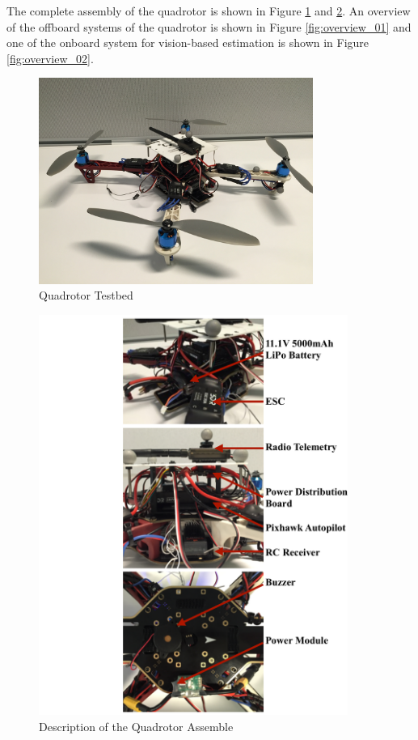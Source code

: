 The complete assembly of the quadrotor is shown in Figure \ref{fig:assemble_01} and \ref{fig:assemble_02}. An overview of the offboard systems of the quadrotor is shown in Figure \ref{fig:overview_01} and one of the onboard system for vision-based estimation is shown in Figure \ref{fig:overview_02}.

\begin{figure}
    \centering
    \includegraphics[width=0.8\textwidth]{graphics/quadrotor.jpg}
    \caption{Quadrotor Testbed}
    \label{fig:assemble_01}
\end{figure}

\begin{figure}
    \centering
    \includegraphics[width=0.9\textwidth]{graphics/hardware.pdf}
    \caption{Description of the Quadrotor Assemble}
    \label{fig:assemble_02}
\end{figure}

